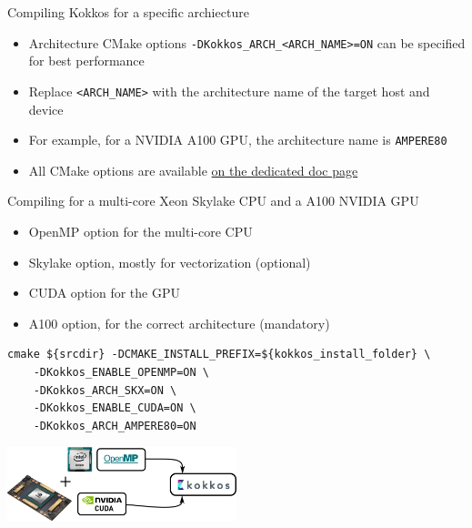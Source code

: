 \documentclass[aspectratio=169]{beamer}
\begin{document}

\begin{frame}{Compiling Kokkos for a specific archiecture}
    \begin{itemize}
        \item Architecture CMake options \texttt{-DKokkos\_ARCH\_<ARCH\_NAME>=ON} can be specified for best performance
        \item Replace \texttt{<ARCH\_NAME>} with the architecture name of the target host and device
        \item For example, for a NVIDIA A100 GPU, the architecture name is \texttt{AMPERE80}
        \item All CMake options are available \href{https://kokkos.org/kokkos-core-wiki/keywords.html}{on the dedicated doc page}
    \end{itemize}
\end{frame}


\begin{frame}[fragile]{Compiling for a multi-core Xeon Skylake CPU and a A100 NVIDIA GPU}
    \begin{itemize}
        \item OpenMP option for the multi-core CPU
        \item Skylake option, mostly for vectorization (optional)
        \item CUDA option for the GPU
        \item A100 option, for the correct architecture (mandatory)
    \end{itemize}
    \begin{verbatim}
cmake ${srcdir} -DCMAKE_INSTALL_PREFIX=${kokkos_install_folder} \
    -DKokkos_ENABLE_OPENMP=ON \
    -DKokkos_ARCH_SKX=ON \
    -DKokkos_ENABLE_CUDA=ON \
    -DKokkos_ARCH_AMPERE80=ON
    \end{verbatim}
    \begin{center}
        \includegraphics[width=0.5\textwidth]{kokkos_a100_backend.png}
    \end{center}
\end{frame}
\end{document}
